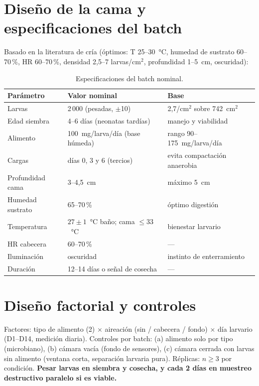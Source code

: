 \documentclass[11pt,a4paper]{article}
\begin{document}
\section{Diseño de la cama y especificaciones del batch}
\label{sec:batch}

Basado en la literatura de cría (óptimos: T 25--30~°C, humedad de
sustrato 60--70\,\%, HR 60--70\,\%, densidad 2{,}5--7
larvas/cm$^2$, profundidad 1--5~cm, oscuridad):

\begin{table}[h]
\centering\small
\caption{Especificaciones del batch nominal.}
\begin{tabular}{@{}lll@{}}
\toprule
Parámetro & Valor nominal & Base \\
\midrule
Larvas & 2\,000 (pesadas, $\pm$10) & 2{,}7/cm$^2$ sobre 742~cm$^2$ \\
Edad siembra & 4--6 días (neonatas tardías) & manejo y viabilidad \\
Alimento & 100~mg/larva/día (base húmeda) & rango 90--175~mg/larva/día \\
Cargas & días 0, 3 y 6 (tercios) & evita compactación anaerobia \\
Profundidad cama & 3--4{,}5~cm & máximo 5~cm \\
Humedad sustrato & 65--70\,\% & óptimo digestión \\
Temperatura & $27\pm1$~°C baño; cama $\leq33$~°C & bienestar larvario \\
HR cabecera & 60--70\,\% & --- \\
Iluminación & oscuridad & instinto de enterramiento \\
Duración & 12--14 días o señal de cosecha & --- \\
\bottomrule
\end{tabular}
\end{table}

\section{Diseño factorial y controles}

Factores: tipo de alimento (2) $\times$ aireación (sin / cabecera /
fondo) $\times$ día larvario (D1--D14, medición diaria).
Controles por batch: (a) alimento solo por tipo (microbiano),
(b) cámara vacía (fondo de sensores), (c) cámara cerrada con larvas
sin alimento (ventana corta, separación larvaria pura).
Réplicas: $n\geq3$ por condición. \textbf{Pesar larvas en siembra y
cosecha, y cada 2 días en muestreo destructivo paralelo si es viable.}
\end{document}
